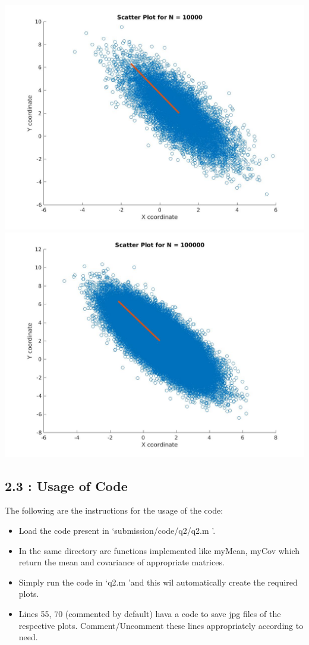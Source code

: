 \documentclass[12pt, a4paper]{article}
\begin{document}
\includegraphics[width=\textwidth, height = 0.25\paperheight]{Scatter_10000}
\includegraphics[width=\textwidth, height = 0.25\paperheight]{Scatter_100000}
 
 

\subsection*{2.3 : Usage of Code}
The following are the instructions for the usage of the code:
\begin{itemize}
\item Load the code present in \lq submission/code/q2/q2.m \rq \space.
\item In the same directory are functions implemented like myMean, myCov which return the mean and covariance of appropriate matrices.
\item Simply run the code in \lq q2.m \rq \space and this wil automatically create the required plots.
\item Lines 55, 70 (commented by default) hava a code to save jpg files of the respective plots. Comment/Uncomment these lines appropriately according to need.
\end{itemize}
 
 
\end{document}
